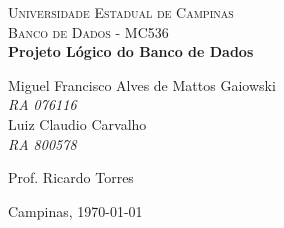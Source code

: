 \begin{titlepage}

\newcommand{\HRule}{\rule{\linewidth}{0.5mm}} 
 
\begin{center}
 

\textsc{\LARGE Universidade Estadual de Campinas}\\[0.5cm]
\textsc{\Large Banco de Dados - MC536}
{\ }\\[4.5cm]
 
{ \huge \bfseries Projeto Lógico do Banco de Dados}\\[3.0cm]
 
\begin{flushright}
Miguel Francisco Alves de Mattos Gaiowski \\
\emph{RA 076116} \\
Luiz Claudio Carvalho\\
\emph{RA 800578} \\[2.0cm]
\end{flushright}


\begin{flushright}
Prof. Ricardo Torres \\
\end{flushright}
 
\vfill
 
{\large Campinas, \today}
 
\end{center}
 
\end{titlepage}

